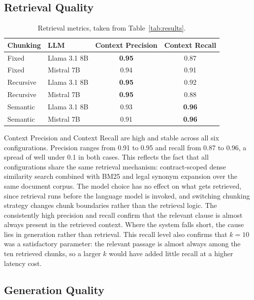 \subsection{Retrieval Quality}

\begin{table}[ht]
\centering
\begin{tabular}{llcc}
\toprule
\textbf{Chunking} & \textbf{LLM} & \textbf{Context Precision} & \textbf{Context Recall} \\
\midrule
Fixed     & Llama 3.1 8B & \textbf{0.95} & 0.87 \\
Fixed     & Mistral 7B   & 0.94 & 0.91 \\
Recursive & Llama 3.1 8B & \textbf{0.95} & 0.92 \\
Recursive & Mistral 7B   & \textbf{0.95} & 0.88 \\
Semantic  & Llama 3.1 8B & 0.93 & \textbf{0.96} \\
Semantic  & Mistral 7B   & 0.91 & \textbf{0.96} \\
\bottomrule
\end{tabular}
\caption{Retrieval metrics, taken from Table~\ref{tab:results}.}
\label{tab:excerpt-retrieval}
\end{table}

Context Precision and Context Recall are high and stable across all six configurations. Precision ranges from 0.91 to 0.95 and recall from 0.87 to 0.96, a spread of well under 0.1 in both cases. This reflects the fact that all configurations share the same retrieval mechanism: contract-scoped dense similarity search combined with BM25 and legal synonym expansion over the same document corpus. The model choice has no effect on what gets retrieved, since retrieval runs before the language model is invoked, and switching chunking strategy changes chunk boundaries rather than the retrieval logic. The consistently high precision and recall confirm that the relevant clause is almost always present in the retrieved context. Where the system falls short, the cause lies in generation rather than retrieval. This recall level also confirms that $k = 10$ was a satisfactory parameter: the relevant passage is almost always among the ten retrieved chunks, so a larger $k$ would have added little recall at a higher latency cost.



\subsection{Generation Quality}

